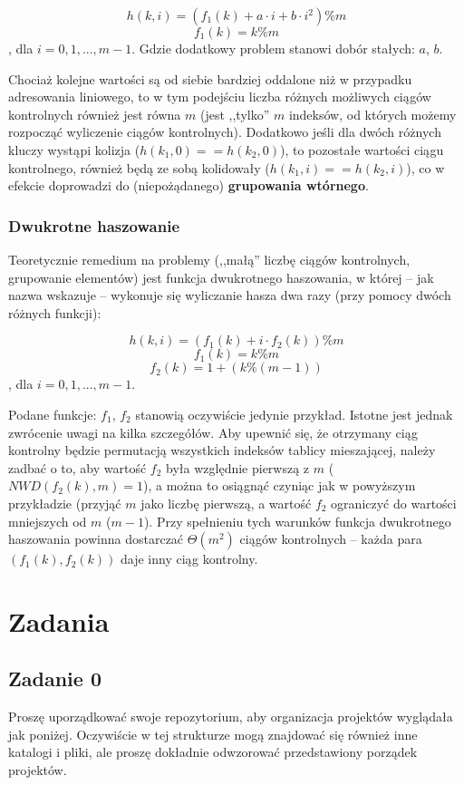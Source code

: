 \documentclass[twoside]{article}
\begin{document}
$$h(k, i) = (f_1(k) + a \cdot i + b \cdot i^2) \% m$$
$$f_1(k) = k \% m$$
, dla $i = 0, 1, ..., m-1$.
Gdzie dodatkowy problem stanowi dobór stałych: $a$, $b$.

Chociaż kolejne wartości są od siebie bardziej oddalone niż w przypadku adresowania liniowego,
to w tym podejściu liczba różnych możliwych ciągów kontrolnych również jest równa $m$ (jest 
,,tylko'' $m$ indeksów, od których możemy rozpocząć wyliczenie ciągów kontrolnych).
Dodatkowo jeśli dla dwóch różnych kluczy wystąpi kolizja ($h(k_1, 0) == h(k_2, 0)$), 
to pozostałe wartości ciągu kontrolnego, również będą ze sobą kolidowały ($h(k_1, i) == h(k_2, i)$),
co w efekcie doprowadzi do (niepożądanego) \textbf{grupowania wtórnego}.

\subsubsection{Dwukrotne haszowanie}
Teoretycznie remedium na problemy (,,małą'' liczbę ciągów kontrolnych, grupowanie elementów)
jest funkcja dwukrotnego haszowania, w której -- jak nazwa wskazuje -- wykonuje się wyliczanie
hasza dwa razy (przy pomocy dwóch różnych funkcji):

$$h(k, i) = (f_1(k) + i \cdot f_2(k)) \% m$$
$$f_1(k) = k \% m$$
$$f_2(k) = 1 + (k \% (m - 1))$$
, dla $i = 0, 1, ..., m-1$.

Podane funkcje: $f_1$, $f_2$ stanowią oczywiście jedynie przykład.
Istotne jest jednak zwrócenie uwagi na kilka szczegółów.
Aby upewnić się, że otrzymany ciąg kontrolny będzie permutacją wszystkich indeksów tablicy 
mieszającej, należy zadbać o to, aby wartość $f_2$ była względnie pierwszą z $m$ 
($NWD(f_2(k), m) = 1$),
a można to osiągnąć czyniąc jak w powyższym przykładzie (przyjąć $m$ jako liczbę pierwszą, a
wartość $f_2$ ograniczyć do wartości mniejszych od $m$ ($m - 1$).
Przy spełnieniu tych warunków funkcja dwukrotnego haszowania powinna dostarczać $\Theta(m^2)$
ciągów kontrolnych -- każda para $(f_1(k), f_2(k))$ daje inny ciąg kontrolny.



\section{Zadania}

\subsection{Zadanie 0}
Proszę uporządkować swoje repozytorium, aby organizacja projektów wyglądała jak poniżej. 
Oczywiście w tej strukturze mogą znajdować się również inne katalogi i pliki, ale proszę
dokładnie odwzorować przedstawiony porządek projektów.
\end{document}

